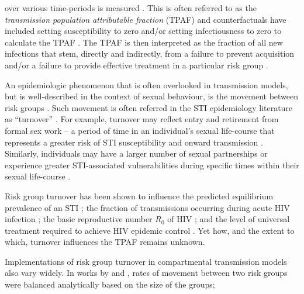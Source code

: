 over various time-periods is measured \citep{Mishra2016,Mukandavire2018}.
This is often referred to as the
\textit{transmission population attributable fraction} (TPAF) 
and counterfactuals have included
setting susceptibility to zero and/or setting 
infectiousness to zero to calculate the TPAF \citep{Mishra2012}.
The TPAF is then interpreted as
the fraction of all new infections that stem, directly and indirectly, from
a failure to prevent acquisition and/or
a failure to provide effective treatment in a particular risk group \citep{Mishra2016}.
\par
An epidemiologic phenomenon that is often overlooked in transmission models,
but is well-described in the context of sexual behaviour,
is the movement between risk groups \citep{Watts2010}.
Such movement is often referred in the STI epidemiology literature as
``turnover'' \citep{Watts2010}.
For example, turnover may reflect entry and retirement from
formal sex work -- a period of time in an individual's sexual life-course
that represents a greater risk of STI susceptibility and 
onward transmission \citep{Watts2010}. Similarly, individuals 
may have a larger number of sexual partnerships or experience
greater STI-associated vulnerabilities during specific times
within their sexual life-course \citep{Marston2006}.
\par
Risk group turnover has been shown to 
influence the predicted equilibrium prevalence of an STI \citep{Stigum1994,Zhang2012};
the fraction of transmissions occurring during acute HIV infection \citep{Zhang2012};
the basic reproductive number $R_0$ of HIV \citep{Henry2015}; and
the level of universal treatment required to achieve HIV epidemic control \citep{Henry2015}.
Yet how, and the extent to which, turnover influences the TPAF remains unknown.
\par
Implementations of risk group turnover in compartmental transmission models also vary widely.
In works by \citeauthor{Koopman1997} and \citeauthor{Stigum1994},
rates of movement between two risk groups
were balanced analytically based on the size of the groups;
